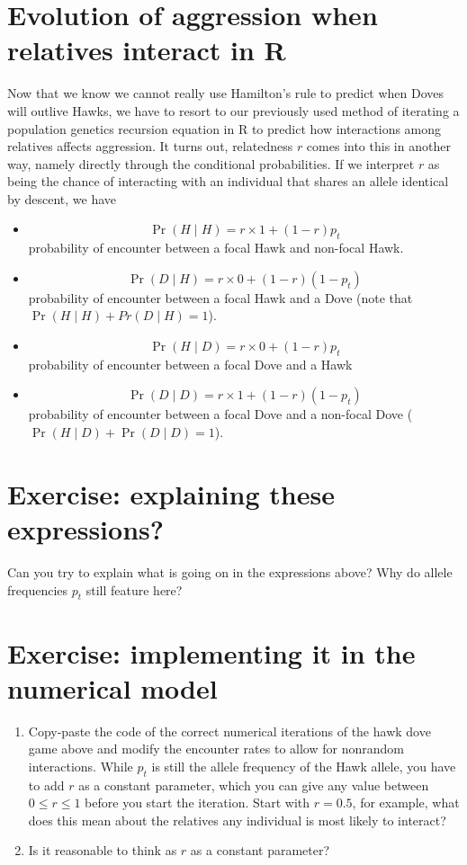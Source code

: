 \documentclass[
]{book}
\providecommand{\tightlist}{%
  \setlength{\itemsep}{0pt}\setlength{\parskip}{0pt}}
\begin{document}
\section{Evolution of aggression when relatives interact in R}\label{evolution-of-aggression-when-relatives-interact-in-r}

Now that we know we cannot really use Hamilton's rule to predict when Doves will outlive Hawks, we have to resort to our previously used method of iterating a population genetics recursion equation in R to predict how interactions among relatives affects aggression. It turns out, relatedness \(r\) comes into this in another way, namely directly through the conditional probabilities. If we interpret \(r\) as being the chance of interacting with an individual that shares an allele identical by descent, we have

\begin{itemize}
\tightlist
\item
  \[\Pr(H \mid H) = r \times 1 + (1-r ) p_{t}\] probability of encounter between a focal Hawk and non-focal Hawk.
\item
  \[\Pr(D \mid H) = r \times 0 + (1-r) (1-p_{t})\] probability of encounter between a focal Hawk and a Dove (note that \(\Pr(H \mid H) + Pr(D \mid H) = 1\)).
\item
  \[\Pr(H \mid D) = r \times 0 + (1-r) p_{t}\] probability of encounter between a focal Dove and a Hawk
\item
  \[\Pr(D \mid D) = r \times 1 + (1- r) (1-p_{t} )\] probability of encounter between a focal Dove and a non-focal Dove (\(\Pr(H \mid D) + \Pr(D \mid D) = 1\)).
\end{itemize}

\section{Exercise: explaining these expressions?}\label{exercise-explaining-these-expressions}

Can you try to explain what is going on in the expressions above? Why do allele frequencies \(p_{t}\) still feature here?

\section{Exercise: implementing it in the numerical model}\label{exercise-implementing-it-in-the-numerical-model}

\begin{enumerate}
\def\labelenumi{\arabic{enumi}.}
\item
  Copy-paste the code of the correct numerical iterations of the hawk dove game above and modify the encounter rates to allow for nonrandom interactions. While \(p_{t}\) is still the allele frequency of the Hawk allele, you have to add \(r\) as a constant parameter, which you can give any value between \(0 \leq r \leq 1\) before you start the iteration. Start with \(r=0.5\), for example, what does this mean about the relatives any individual is most likely to interact?
\item
  Is it reasonable to think as \(r\) as a constant parameter?
\end{enumerate}
\end{document}
